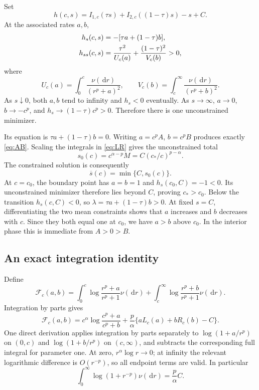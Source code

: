 \documentclass[11pt,letterpaper]{article}
\numberwithin{equation}{section}
\theoremstyle{definition}
\theoremstyle{remark}
\newcommand{\dd}{\,\mathrm d}
\begin{document}
Set
\begin{equation}\label{eq:h}
 h(c,s)=I_{1,c}(\tau s)+I_{2,c}((1-\tau)s)-s+C.
\end{equation}
At the associated rates $a,b$,
\begin{align}\label{eq:h_derivs}
 h_s(c,s)&=-[\tau a+(1-\tau)b],\notag\\
 h_{ss}(c,s)&=\frac{\tau^2}{U_c(a)}+
 \frac{(1-\tau)^2}{V_c(b)}>0,
\end{align}
where
\[
 U_c(a)=\int_0^c\frac{\nu(\dd r)}{(r^p+a)^2},\qquad
 V_c(b)=\int_c^\infty\frac{\nu(\dd r)}{(r^p+b)^2}.
\]
As $s\downarrow0$, both $a,b$ tend to infinity and $h_s<0$ eventually. As $s\to\infty$, $a\to0$, $b\to-c^p$, and $h_s\to(1-\tau)c^p>0$. Therefore there is one unconstrained minimizer.

Its equation is $\tau a+(1-\tau)b=0$. Writing $a=c^pA$, $b=c^pB$ produces exactly \cref{eq:AB}. Scaling the integrals in \cref{eq:LR} gives the unconstrained total
\begin{equation}\label{eq:s0}
 s_0(c)=c^{\alpha-p}M=C(c_*/c)^{p-\alpha}.
\end{equation}
The constrained solution is consequently
\begin{equation}\label{eq:sbar}
 \boxed{\overline s(c)=\min\{C,s_0(c)\}.}
\end{equation}
At $c=c_0$, the boundary point has $a=b=1$ and $h_s(c_0,C)=-1<0$. Its unconstrained minimizer therefore lies beyond $C$, proving $c_*>c_0$. Below the transition $h_s(c,C)<0$, so $\lambda=\tau a+(1-\tau)b>0$. At fixed $s=C$, differentiating the two mean constraints shows that $a$ increases and $b$ decreases with $c$. Since they both equal one at $c_0$, we have $a>b$ above $c_0$. In the interior phase this is immediate from $A>0>B$.

\subsection{An exact integration identity}

Define
\begin{equation}\label{eq:F}
 \mathcal F_c(a,b)=\int_0^c\log\frac{r^p+a}{r^p+1}\nu(\dd r)
 +\int_c^\infty\log\frac{r^p+b}{r^p+1}\nu(\dd r).
\end{equation}
Integration by parts gives
\begin{equation}\label{eq:IBP}
 \mathcal F_c(a,b)=c^\alpha\log\frac{c^p+a}{c^p+b}
 +\frac p\alpha\{aL_c(a)+bR_c(b)-C\}.
\end{equation}
One direct derivation applies integration by parts separately to $\log(1+a/r^p)$ on $(0,c)$ and $\log(1+b/r^p)$ on $(c,\infty)$, and subtracts the corresponding full integral for parameter one. At zero, $r^\alpha\log r\to0$; at infinity the relevant logarithmic difference is $O(r^{-p})$, so all endpoint terms are valid. In particular
\[
 \int_0^\infty\log(1+r^{-p})\nu(\dd r)=\frac p\alpha C.
\]
\end{document}
